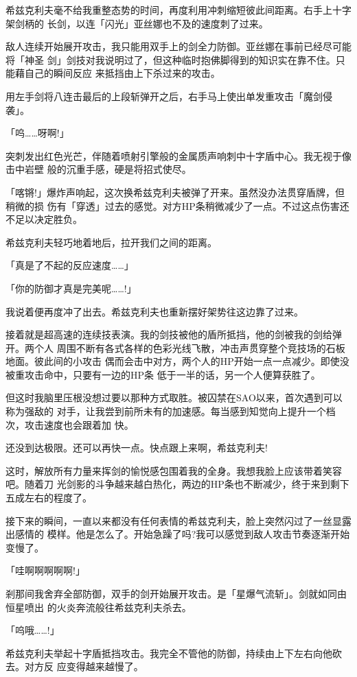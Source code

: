 \documentclass[11pt]{book}
\begin{document}
希兹克利夫毫不给我重整态势的时间，再度利用冲刺缩短彼此间距离。右手上十字架剑柄的
长剑，以连「闪光」亚丝娜也不及的速度刺了过来。

敌人连续开始展开攻击，我只能用双手上的剑全力防御。亚丝娜在事前已经尽可能将「神圣
剑」剑技对我说明过了，但这种临时抱佛脚得到的知识实在靠不住。只能藉自己的瞬间反应
来抵挡由上下杀过来的攻击。

用左手剑将八连击最后的上段斩弹开之后，右手马上使出单发重攻击「魔剑侵袭」。

「呜……呀啊!」

突刺发出红色光芒，伴随着喷射引擎般的金属质声响刺中十字盾中心。我无视于像击中岩壁
般的沉重手感，硬是将招式使尽。

「喀锵!」爆炸声响起，这次换希兹克利夫被弹了开来。虽然没办法贯穿盾牌，但稍微的损
伤有「穿透」过去的感觉。对方HP条稍微减少了一点。不过这点伤害还不足以决定胜负。

希兹克利夫轻巧地着地后，拉开我们之间的距离。

「真是了不起的反应速度……」

「你的防御才真是完美呢……!」

我说着便再度冲了出去。希兹克利夫也重新摆好架势往这边靠了过来。

接着就是超高速的连续技表演。我的剑技被他的盾所抵挡，他的剑被我的剑给弹开。两个人
周围不断有各式各样的色彩光线飞散，冲击声贯穿整个竞技场的石板地面。彼此间的小攻击
偶而会击中对方，两个人的HP开始一点一点减少。即使没被重攻击命中，只要有一边的HP条
低于一半的话，另一个人便算获胜了。

但这时我脑里压根没想过要以那种方式取胜。被囚禁在SAO以来，首次遇到可以称为强敌的
对手，让我尝到前所未有的加速感。每当感到知觉向上提升一个档次，攻击速度也会跟着加
快。

还没到达极限。还可以再快一点。快点跟上来啊，希兹克利夫!

这时，解放所有力量来挥剑的愉悦感包围着我的全身。我想我脸上应该带着笑容吧。随着刀
光剑影的斗争越来越白热化，两边的HP条也不断减少，终于来到剩下五成左右的程度了。

接下来的瞬间，一直以来都没有任何表情的希兹克利夫，脸上突然闪过了一丝显露出感情的
模样。他是怎么了。开始急躁了吗?我可以感觉到敌人攻击节奏逐渐开始变慢了。

「哇啊啊啊啊啊!」

剎那间我舍弃全部防御，双手的剑开始展开攻击。是「星爆气流斩」。剑就如同由恒星喷出
的火炎奔流般往希兹克利夫杀去。

「呜哦……!」

希兹克利夫举起十字盾抵挡攻击。我完全不管他的防御，持续由上下左右向他砍去。对方反
应变得越来越慢了。
\end{document}
